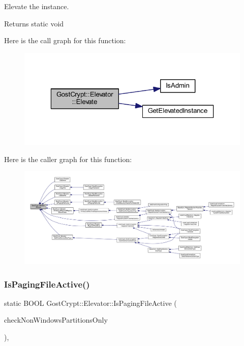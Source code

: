 Elevate the instance. 

\begin{DoxyReturn}{Returns}
static void 
\end{DoxyReturn}
Here is the call graph for this function\+:
\nopagebreak
\begin{figure}[H]
\begin{center}
\leavevmode
\includegraphics[width=323pt]{class_gost_crypt_1_1_elevator_a0b5a981fa1fa7f2b93f39c55a5ba20e1_cgraph}
\end{center}
\end{figure}
Here is the caller graph for this function\+:
\nopagebreak
\begin{figure}[H]
\begin{center}
\leavevmode
\includegraphics[width=350pt]{class_gost_crypt_1_1_elevator_a0b5a981fa1fa7f2b93f39c55a5ba20e1_icgraph}
\end{center}
\end{figure}
\mbox{\label{class_gost_crypt_1_1_elevator_a2ebe7f1b09bc239343ec039ac6748543}} 
\subsubsection{\texorpdfstring{Is\+Paging\+File\+Active()}{IsPagingFileActive()}}
{\footnotesize\ttfamily static B\+O\+OL Gost\+Crypt\+::\+Elevator\+::\+Is\+Paging\+File\+Active (\begin{DoxyParamCaption}\item[{B\+O\+OL}]{check\+Non\+Windows\+Partitions\+Only }\end{DoxyParamCaption})\hspace{0.3cm}{\ttfamily [inline]}, {\ttfamily [static]}}



